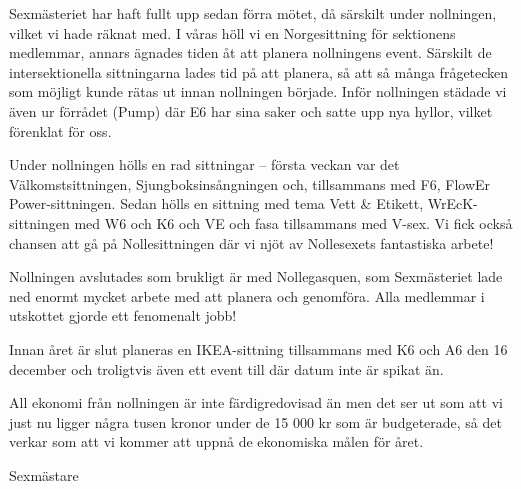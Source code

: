 \documentclass[../_main/handlingar.tex]{subfiles}
\begin{document}
Sexmästeriet har haft fullt upp sedan förra mötet, då särskilt under nollningen, vilket vi hade räknat med. I våras höll vi en Norgesittning för sektionens medlemmar, annars ägnades tiden åt att planera nollningens event. Särskilt de intersektionella sittningarna lades tid på att planera, så att så många frågetecken som möjligt kunde rätas ut innan nollningen började. Inför nollningen städade vi även ur förrådet (Pump) där E6 har sina saker och satte upp nya hyllor, vilket förenklat för oss.

Under nollningen hölls en rad sittningar – första veckan var det Välkomstsittningen, Sjungboksinsångningen och, tillsammans med F6, FlowEr Power-sittningen. Sedan hölls en sittning med tema Vett \& Etikett, WrEcK-sittningen med W6 och K6 och VE och fasa tillsammans med V-sex. Vi fick också chansen att gå på Nollesittningen där vi njöt av Nollesexets fantastiska arbete!

Nollningen avslutades som brukligt är med Nollegasquen, som Sexmästeriet lade ned enormt mycket arbete med att planera och genomföra. Alla medlemmar i utskottet gjorde ett fenomenalt jobb!

Innan året är slut planeras en IKEA-sittning tillsammans med K6 och A6 den 16 december och troligtvis även ett event till där datum inte är spikat än.

All ekonomi från nollningen är inte färdigredovisad än men det ser ut som att vi just nu ligger några tusen kronor under de 15 000 kr som är budgeterade, så det verkar som att vi kommer att uppnå de ekonomiska målen för året.

\begin{signatures}{1}
    \mvh
    \signature{Linnea Sjödahl}{Sexmästare}
\end{signatures}
\end{document}
